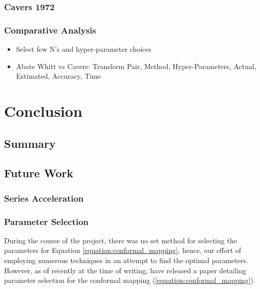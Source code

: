 \documentclass[a4paper]{report}
\begin{document}
\subsection{Cavers 1972}


\subsection{Comparative Analysis}
\begin{itemize}
	\item Select few N's and hyper-parameter choices
	\item Abate Whitt vs Cavers: Transform Pair, Method, Hyper-Parameters, Actual, Estimated, Accuracy, Time	
\end{itemize}


\chapter{Conclusion}

\section{Summary}

\section{Future Work}

\subsection{Series Acceleration}

\subsection{Parameter Selection}
During the course of the project, there was no set method for selecting the parameters for Equation \ref{equation:conformal_mapping}, hence, our effort of employing numerous techniques in an attempt to find the optimal parameters. However, as of recently at the time of writing, \citet{boyarchenko2024efficient} have released a paper detailing parameter selection for the conformal mapping (\ref{equation:conformal_mapping}).





\end{document}
